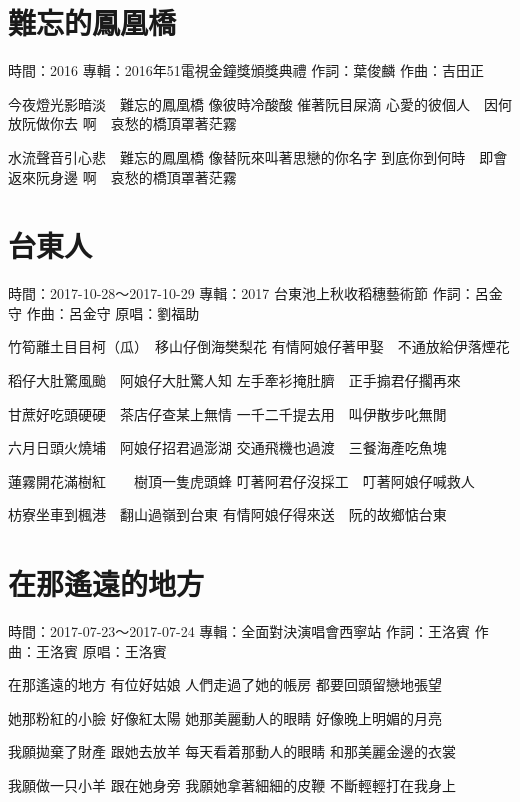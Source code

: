 \documentclass[UTF8,a4paper,oneside,twocolumn,12pt]{ctexbook}
\newcommand{\infopair}[2]{\textbullet #1：#2}
\newcommand{\zc}[1][伍佰]{\infopair{作詞}{#1}}
\newcommand{\zq}[1][伍佰]{\infopair{作曲}{#1}}
\newcommand{\zj}[1]{\infopair{專輯}{#1}}
\newcommand{\yc}[1]{\infopair{原唱}{#1}}
\newcommand{\sj}[1]{\infopair{時間}{#1}}
\newenvironment{info}{\begin{flushleft}\kaishu
	}
	{\end{flushleft}\normalsize\yahei\par}
\newenvironment{lyric}{
	}
{}
\begin{document}
\section{難忘的鳳凰橋}
\begin{info}
	\sj{2016}
	\zj{2016年51電視金鐘獎頒獎典禮}
	\zc[葉俊麟]
	\zq[吉田正]
\end{info}
\begin{lyric}
	今夜燈光影暗淡　難忘的鳳凰橋
	像彼時冷酸酸 催著阮目屎滴
	心愛的彼個人　因何放阮做你去
	啊　哀愁的橋頂罩著茫霧

	水流聲音引心悲　難忘的鳳凰橋
	像替阮來叫著思戀的你名字
	到底你到何時　即會返來阮身邊
	啊　哀愁的橋頂罩著茫霧
\end{lyric}

\section{台東人}
\begin{info}
	\sj{2017-10-28～2017-10-29}
	\zj{2017 台東池上秋收稻穗藝術節}
	\zc[呂金守]
	\zq[呂金守]
	\yc{劉福助}
\end{info}
\begin{lyric}
	竹筍離土目目柯（瓜）　移山仔倒海樊梨花
	有情阿娘仔著甲娶　不通放給伊落煙花

	稻仔大肚驚風颱　阿娘仔大肚驚人知
	左手牽衫掩肚臍　正手搧君仔擱再來

	甘蔗好吃頭硬硬　茶店仔查某上無情
	一千二千提去用　叫伊散步叱無閒

	六月日頭火燒埔　阿娘仔招君過澎湖
	交通飛機也過渡　三餐海產吃魚塊

	蓮霧開花滿樹紅　　樹頂一隻虎頭蜂
	叮著阿君仔沒採工　叮著阿娘仔喊救人

	枋寮坐車到楓港　翻山過嶺到台東
	有情阿娘仔得來送　阮的故鄉惦台東
\end{lyric}

\section{在那遙遠的地方}%
\begin{info}
	\sj{2017-07-23～2017-07-24}
	\zj{全面對決演唱會西寧站}
	\zc[王洛賓]
	\zq[王洛賓]
	\yc{王洛賓}
\end{info}
\begin{lyric}%
	在那遙遠的地方 有位好姑娘
	人們走過了她的帳房 都要回頭留戀地張望

	她那粉紅的小臉 好像紅太陽
	她那美麗動人的眼睛 好像晚上明媚的月亮

	我願拋棄了財產 跟她去放羊
	每天看着那動人的眼睛 和那美麗金邊的衣裳

	我願做一只小羊 跟在她身旁
	我願她拿著細細的皮鞭 不斷輕輕打在我身上
\end{lyric}
\end{document}
